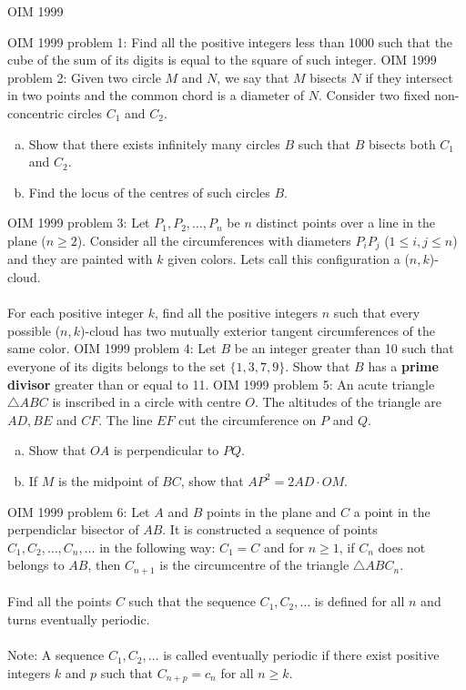 OIM 1999 

OIM 1999 problem 1:  Find all the positive integers less than 1000 such that the cube of the sum of its digits  is equal to the square of such integer. 
OIM 1999 problem 2:  Given two circle $M$ and $N$, we say that $M$ bisects $N$ if they intersect in two points and the common chord is a diameter of $N$. Consider two fixed non-concentric circles $C_1$ and $C_2$.
\begin{enumerate}[a)]
  \item Show that there exists infinitely many circles $B$ such that $B$ bisects both $C_1$ and $C_2$.
  \item Find the locus of the centres of such circles $B$.
\end{enumerate} 
OIM 1999 problem 3:  Let $P_1,P_2,\dots,P_n$ be $n$ distinct points over a line in the plane ($n\geq2$). Consider all the circumferences with diameters $P_iP_j$ ($1\leq{i,j}\leq{n}$) and they are painted with $k$ given colors. Lets call this configuration a ($n,k$)-cloud. \\\\
For each positive integer $k$, find all the positive integers $n$ such that every possible ($n,k$)-cloud has two mutually exterior tangent circumferences of the same color. 
OIM 1999 problem 4:  Let $B$ be an integer greater than 10 such that everyone of its digits belongs to the set $\{1,3,7,9\}$. Show that $B$ has a \textbf{prime divisor}  greater than or equal to 11. 
OIM 1999 problem 5:  An acute triangle $\triangle{ABC}$ is inscribed in a circle with centre $O$. The altitudes of the triangle are $AD,BE$ and $CF$. The line $EF$ cut the circumference on $P$ and $Q$.
\begin{enumerate}[a)]
  \item Show that $OA$ is perpendicular to $PQ$.
  \item If $M$ is the midpoint of $BC$, show that $AP^2=2AD\cdot{OM}$.
\end{enumerate} 
OIM 1999 problem 6:  Let $A$ and $B$ points in the plane and $C$ a point in the perpendiclar bisector of $AB$. It is constructed a sequence of points $C_1,C_2,\dots, C_n,\dots$ in the following way: $C_1=C$ and for $n\geq1$, if $C_n$ does not belongs to $AB$, then $C_{n+1}$ is the circumcentre of the triangle $\triangle{ABC_n}$. \\\\
Find all the points $C$ such that the sequence $C_1,C_2,\dots$ is defined for all $n$ and turns eventually periodic. \\\\
Note: A sequence $C_1,C_2, \dots$ is called eventually periodic if there exist positive integers $k$ and $p$ such that $C_{n+p}=c_n$ for all $n\geq{k}$. 

